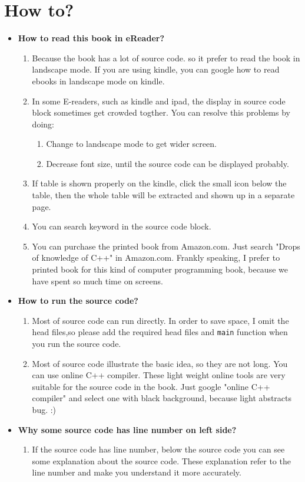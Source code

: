 \documentclass[a4paper,11pt,twoside]{book}
\begin{document}
\chapter*{How to?}
\begin{itemize}
	\item \textbf{How to read this book in eReader?}
	\begin{enumerate}
		\item Because the book has a lot of source code. so it prefer to read the book in landscape mode. If you are using kindle, you can google how to read ebooks in landscape mode on kindle. 
		
		\item In some E-readers, such as kindle and ipad, the display in source code block sometimes get crowded togther. You can resolve this problems by doing:
		\begin{enumerate}
			\item Change to landscape mode to get wider screen.
			\item Decrease font size, until the source code can be displayed probably.
		\end{enumerate}
		
		\item If table is shown properly on the kindle, click the small icon below the table, then the whole table will be extracted and shown up in a separate page. 
		
		\item You can search keyword in the source code block.
		
		\item You can purchase the printed book from Amazon.com. Just search "Drops of knowledge of C++" in Amazon.com. Frankly speaking, I prefer to printed book for this kind of computer programming book, because we have spent so much time on screens.
		
		
	\end{enumerate}

	\item \textbf{How to run the source code?}
	\begin{enumerate}
		\item Most of source code can run directly. In order to save space, I omit the head files,so please add the required head files and \texttt{main} function when you run the source code.
		
		\item Most of source code illustrate the basic idea, so they are not long. You can use online C++ compiler. These light weight online tools are very suitable for the source code in the book. Just google "online C++ compiler" and select one with black background, because light abstracts bug. :)
	\end{enumerate}
	\item \textbf{Why some source code has line number on left side?}
	\begin{enumerate}
		\item If the source code has line number, below the source code you can see some explanation about the source code. These explanation refer to the line number and make you understand it more accurately.



\end{enumerate}
\end{itemize}
\end{document}
